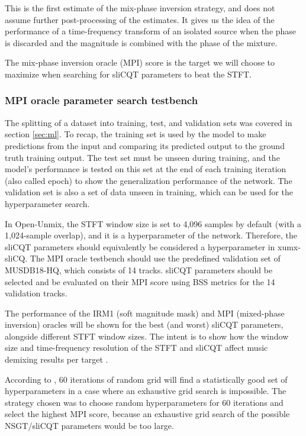 \documentclass[report.tex]{subfiles}
\begin{document}
This is the first estimate of the mix-phase inversion strategy, and does not assume further post-processing of the estimates. It gives us the idea of the performance of a time-frequency transform of an isolated source when the phase is discarded and the magnitude is combined with the phase of the mixture.

The mix-phase inversion oracle (MPI) score is the target we will choose to maximize when searching for sliCQT parameters to beat the STFT.

\subsubsection{MPI oracle parameter search testbench}
\label{sec:mpiparam}

The splitting of a dataset into training, test, and validation sets was covered in section \ref{sec:ml}. To recap, the training set is used by the model to make predictions from the input and comparing its predicted output to the ground truth training output. The test set must be unseen during training, and the model's performance is tested on this set at the end of each training iteration (also called epoch) to show the generalization performance of the network. The validation set is also a set of data unseen in training, which can be used for the hyperparameter search.

In Open-Unmix, the STFT window size is set to 4,096 samples by default (with a 1,024-sample overlap), and it is a hyperparameter of the network. Therefore, the sliCQT parameters should equivalently be considered a hyperparameter in xumx-sliCQ. The MPI oracle testbench should use the predefined validation set of MUSDB18-HQ, which consists of 14 tracks. sliCQT parameters should be selected and be evaluated on their MPI score using BSS metrics for the 14 validation tracks.

The performance of the IRM1 (soft magnitude mask) and MPI (mixed-phase inversion) oracles will be shown for the best (and worst) sliCQT parameters, alongside different STFT window sizes. The intent is to show how the window size and time-frequency resolution of the STFT and sliCQT affect music demixing results per target \parencite{tftradeoff1}.

According to \textcite{randomgrid}, 60 iterations of random grid will find a statistically good set of hyperparameters in a case where an exhaustive grid search is impossible. The strategy chosen was to choose random hyperparameters for 60 iterations and select the highest MPI score, because an exhaustive grid search of the possible NSGT/sliCQT parameters would be too large. 
\end{document}

